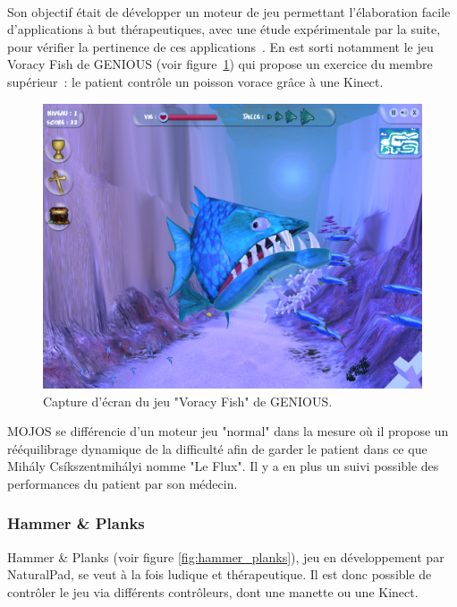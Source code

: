 \paragraph{}
Son objectif était de développer un moteur de jeu permettant 
l'élaboration facile d'applications à but thérapeutiques, avec une étude 
expérimentale
par la suite, pour vérifier la pertinence de ces applications~\cite{mojos}. En est sorti 
notamment le jeu Voracy Fish de GENIOUS (voir figure~\ref{fig:voracy_fish})
qui propose un exercice du membre supérieur~: le patient contrôle un poisson 
vorace grâce à une Kinect.

\begin{figure}[h!]
\centering
\includegraphics[width=0.8\linewidth]{images/voracy_fish}
\caption{Capture d'écran du jeu "Voracy Fish" de GENIOUS.}
\label{fig:voracy_fish}
\end{figure}

MOJOS se différencie d'un moteur jeu "normal" dans la mesure où il propose
un rééquilibrage dynamique de la difficulté afin de garder le patient dans
ce que Mihály Csíkszentmihályi nomme "Le Flux"\cite{flow}. Il y a en plus un suivi possible 
des performances du patient par son médecin.

\subsubsection{Hammer \& Planks}
Hammer \& Planks (voir figure \ref{fig:hammer_planks}), jeu en développement par NaturalPad, se veut à la fois 
ludique et thérapeutique. Il est donc possible de contrôler le jeu via différents contrôleurs, dont une manette ou une Kinect.

